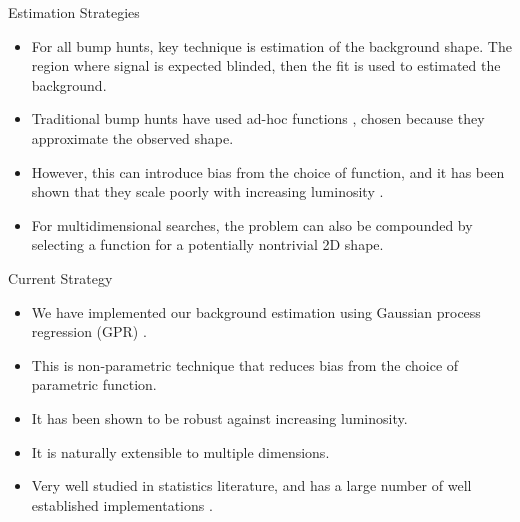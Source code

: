 \documentclass[10pt]{beamer}
\begin{document}
\begin{frame}{Estimation Strategies}
  \begin{splitcol}[0.55]
    \begin{col}
      \begin{itemize}
      \item For all bump hunts, key technique is estimation of the background shape. The region where signal is expected blinded, then the fit is used to estimated the background.
      \item Traditional bump hunts have used ad-hoc functions \cite{zisopoulos_parametric_2023}, chosen because they approximate the observed shape. 
      \item However, this can introduce bias from the choice of function, and it has been shown that they scale poorly with increasing luminosity \cite{frate_modeling_2017}.
      \item For multidimensional searches, the problem can also be compounded by selecting a function for a potentially nontrivial 2D shape. 
      \end{itemize}
    \end{col}

    \begin{col}
      \begin{center}
      \end{center}
    \end{col}
  \end{splitcol}
\end{frame}

\begin{frame}{Current Strategy}
  \begin{itemize}
  \item We have implemented our background estimation using Gaussian process regression (GPR) \cite{rasmussen_gaussian_2006}.
  \item This is non-parametric technique that reduces bias from the choice of parametric function.
  \item It has been shown to be robust against increasing luminosity\cite{frate_modeling_2017}.
  \item It is naturally extensible to multiple dimensions.
  \item Very well studied in statistics literature\cite{gardner_gpytorch_2021}, and has a large number of well established implementations \cite{noauthor_comparison_2024, gardner_gpytorch_2021}.
  \end{itemize}
\end{frame}
\end{document}
